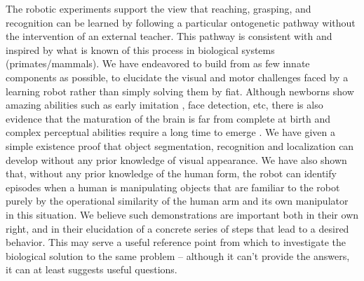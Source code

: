 The robotic experiments support the view that reaching, grasping, and recognition
can be learned by following a particular ontogenetic pathway without the
intervention of an external teacher.
This pathway is consistent with and inspired by what is
known of this process in biological systems (primates/mammals).
%
We have endeavored to build from as few innate components as possible, to
elucidate the visual and motor challenges faced by a learning robot rather
than simply solving them by fiat.
%
Although newborns show amazing abilities \cite{spelke-2000} such as early imitation 
\cite{meltzoff-moore-1977}, face detection, etc, there is also evidence 
that the maturation of the brain is far from complete at birth and
complex perceptual abilities require a long time to emerge \cite{kovacs00human}.
%
We have given a simple existence proof that object segmentation,
recognition and localization can develop without any prior knowledge
of visual appearance.  We have also shown that, without any prior
knowledge of the human form, the robot can identify episodes when a
human is manipulating objects that are familiar to the robot purely by
the operational similarity of the human arm and its own manipulator in
this situation.  We believe such demonstrations are important both in
their own right, and in their elucidation of a concrete series of
steps that lead to a desired behavior.  This may serve a useful
reference point from which to investigate the biological solution to
the same problem -- although it can't provide the answers, it can at
least suggests useful questions.

%



